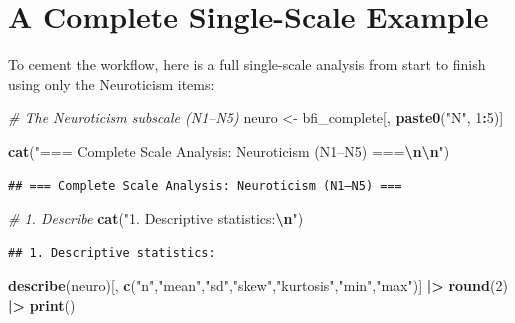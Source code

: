 \documentclass[
]{article}
\newenvironment{Shaded}{\begin{snugshade}}{\end{snugshade}}
\newcommand{\CommentTok}[1]{\textcolor[rgb]{0.56,0.35,0.01}{\textit{#1}}}
\newcommand{\DecValTok}[1]{\textcolor[rgb]{0.00,0.00,0.81}{#1}}
\newcommand{\FunctionTok}[1]{\textcolor[rgb]{0.13,0.29,0.53}{\textbf{#1}}}
\newcommand{\NormalTok}[1]{#1}
\newcommand{\OtherTok}[1]{\textcolor[rgb]{0.56,0.35,0.01}{#1}}
\newcommand{\SpecialCharTok}[1]{\textcolor[rgb]{0.81,0.36,0.00}{\textbf{#1}}}
\newcommand{\StringTok}[1]{\textcolor[rgb]{0.31,0.60,0.02}{#1}}
\begin{document}
\section{A Complete Single-Scale
Example}\label{a-complete-single-scale-example}

To cement the workflow, here is a full single-scale analysis from start
to finish using only the Neuroticism items:

\begin{Shaded}
\begin{Highlighting}[]
\CommentTok{\# The Neuroticism subscale (N1–N5)}
\NormalTok{neuro }\OtherTok{\textless{}{-}}\NormalTok{ bfi\_complete[, }\FunctionTok{paste0}\NormalTok{(}\StringTok{"N"}\NormalTok{, }\DecValTok{1}\SpecialCharTok{:}\DecValTok{5}\NormalTok{)]}

\FunctionTok{cat}\NormalTok{(}\StringTok{"=== Complete Scale Analysis: Neuroticism (N1–N5) ===}\SpecialCharTok{\textbackslash{}n\textbackslash{}n}\StringTok{"}\NormalTok{)}
\end{Highlighting}
\end{Shaded}

\begin{verbatim}
## === Complete Scale Analysis: Neuroticism (N1–N5) ===
\end{verbatim}

\begin{Shaded}
\begin{Highlighting}[]
\CommentTok{\# 1. Describe}
\FunctionTok{cat}\NormalTok{(}\StringTok{"1. Descriptive statistics:}\SpecialCharTok{\textbackslash{}n}\StringTok{"}\NormalTok{)}
\end{Highlighting}
\end{Shaded}

\begin{verbatim}
## 1. Descriptive statistics:
\end{verbatim}

\begin{Shaded}
\begin{Highlighting}[]
\FunctionTok{describe}\NormalTok{(neuro)[, }\FunctionTok{c}\NormalTok{(}\StringTok{"n"}\NormalTok{,}\StringTok{"mean"}\NormalTok{,}\StringTok{"sd"}\NormalTok{,}\StringTok{"skew"}\NormalTok{,}\StringTok{"kurtosis"}\NormalTok{,}\StringTok{"min"}\NormalTok{,}\StringTok{"max"}\NormalTok{)] }\SpecialCharTok{|\textgreater{}}
  \FunctionTok{round}\NormalTok{(}\DecValTok{2}\NormalTok{) }\SpecialCharTok{|\textgreater{}}
  \FunctionTok{print}\NormalTok{()}
\end{Highlighting}
\end{Shaded}
\end{document}
